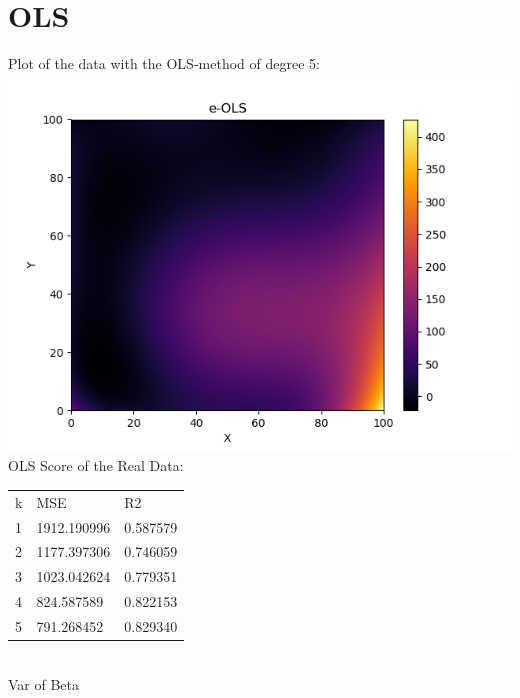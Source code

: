 \documentclass[a4paper,norsk]{article}
\begin{document}
\section*{OLS}
Plot of the data with the OLS-method of degree 5:
\\ \includegraphics[scale=.7]{e-OLS}
\\ OLS Score of the Real Data:
\begin{table}[!h]
\begin{tabular}{lll}
k & MSE                   & R2                 \\
1 & 1912.190996  & 0.587579 \\
2 & 1177.397306  & 0.746059 \\
3 & 1023.042624  & 0.779351 \\
4 & 824.587589  & 0.822153 \\
5 & 791.268452 & 0.829340
\end{tabular}
\end{table}
\\Var of Beta
\begin{align*}
[  2.32350868e-17\quad   3.59021583e-14 \quad  9.26320612e-14\quad   6.67623760e-12\\
   2.76179532e-12\quad   2.44594128e-11 \quad  1.00899287e-09  \quad 2.82477031e-08\\
   3.26102575e-08 \quad  4.03014136e-09 \quad  7.93068781e-13  \quad 8.29815731e-12\\
   2.72417498e-12 \quad  8.99036913e-12 \quad  2.47909085e-12 \quad  4.07929803e-17\\
   2.67723887e-16 \quad  5.18767547e-16 \quad  4.23509770e-16 \quad  1.84571052e-16\\
   9.42227510e-17]
\end{align*}
\end{document}
